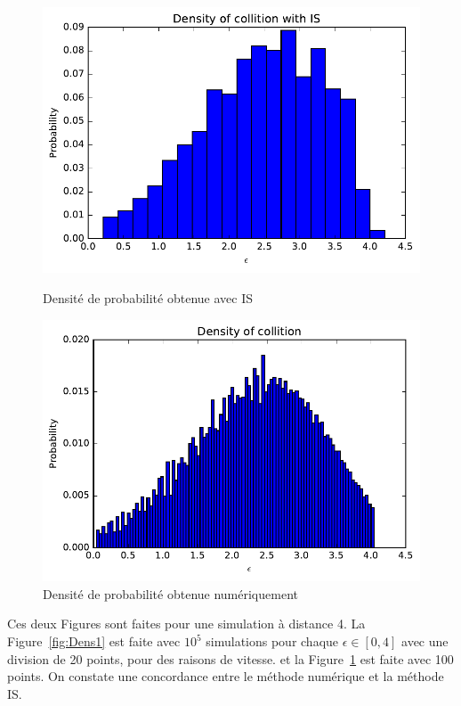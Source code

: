 \documentclass[a4paper, 12pt,twoside]{article}
\numberwithin{equation}{subsection}
\newlength{\mylength}
\begin{document}
	\begin{figure}[htbp]
		\centering
		\begin{minipage}[b]{\mylength}
			\includegraphics[width=\textwidth]{Images/Script_14_2}
			\caption{Densité de probabilité obtenue avec IS}
			\label{fig:Dens1}
		\end{minipage}
		\hfill
		\begin{minipage}[b]{\mylength}
			\includegraphics[width=\textwidth]{Images/Script_14_1}
			\caption{Densité de probabilité obtenue numériquement}
			\label{fig:Dens2}
		\end{minipage}
	\end{figure}
	
	Ces deux Figures sont faites pour une simulation à distance 4. La Figure~\ref{fig:Dens1} est faite avec $10^5$ simulations pour chaque $\epsilon \in [0,4]$ avec une division de 20 points, pour des raisons de vitesse. et la Figure~\ref{fig:Dens2} est faite avec 100 points. On constate une concordance entre le méthode numérique et la méthode IS.
	
\end{document}
